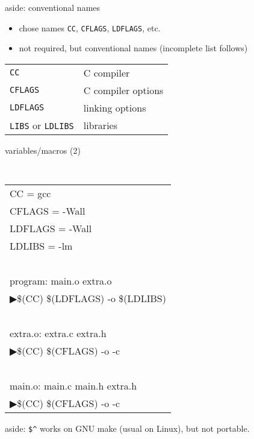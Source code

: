 \begin{frame}{aside: conventional names}
\begin{itemize}
\item chose names \texttt{CC}, \texttt{CFLAGS}, \texttt{LDFLAGS}, etc.
\item not required, but conventional names (incomplete list follows)
\end{itemize}
\begin{tabular}{ll}
\texttt{CC} & C compiler \\
\texttt{CFLAGS} & C compiler options \\
\texttt{LDFLAGS} & linking options \\
\texttt{LIBS} or \texttt{LDLIBS} & libraries \\
\end{tabular}
\end{frame}

\begin{frame}{variables/macros (2)}

{\small\tt
\begin{tabular}{l}
CC = gcc \\
CFLAGS = -Wall \\
LDFLAGS = -Wall \\
LDLIBS = -lm \\
~ \\
program: main.o extra.o \\
▶\hspace{1.5cm}\$(CC) \$(LDFLAGS) -o \myemph{\$@} \myemph{\$\textasciicircum} \$(LDLIBS) \\
~ \\
extra.o: extra.c extra.h \\
▶\hspace{1.5cm}\$(CC) \$(CFLAGS) -o \myemph{\$@} -c \myemph{\$<} \\
~ \\
main.o: main.c main.h extra.h \\
▶\hspace{1.5cm}\$(CC) \$(CFLAGS) -o \myemph{\$@} -c \myemph{\$<} \\
\end{tabular}
}

{\small aside: \texttt{\$\textasciicircum} works on GNU make (usual on Linux), but not portable.}
\end{frame}

